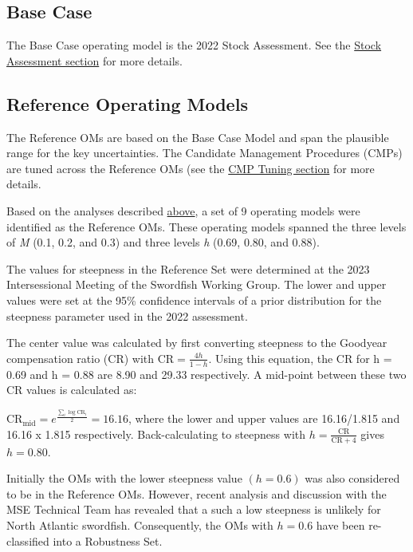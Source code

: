 \documentclass[
]{article}
\begin{document}
\hypertarget{base-case}{%
\subsection{Base Case}\label{base-case}}

The Base Case operating model is the 2022 Stock Assessment. See the \protect\hyperlink{stock-assessment}{Stock Assessment section} for more details.

\hypertarget{reference_models}{%
\subsection{Reference Operating Models}\label{reference_models}}

The Reference OMs are based on the Base Case Model and span the plausible range for the key uncertainties. The Candidate Management Procedures (CMPs) are tuned across the Reference OMs (see the \protect\hyperlink{tuning}{CMP Tuning section} for more details.

Based on the analyses described \protect\hyperlink{om-conditioning}{above}, a set of 9 operating models were identified as the Reference OMs. These operating models spanned the three levels of \emph{M} (0.1, 0.2, and 0.3) and three levels \emph{h} (0.69, 0.80, and 0.88).

The values for steepness in the Reference Set were determined at the 2023 Intersessional Meeting of the Swordfish Working Group. The lower and upper values were set at the 95\% confidence intervals of a prior distribution for the steepness parameter used in the 2022 assessment.

The center value was calculated by first converting steepness to the Goodyear compensation ratio (CR) with \(\text{CR}=\frac{4h}{1-h}\). Using this equation, the CR for h = 0.69 and h = 0.88 are 8.90 and 29.33 respectively. A mid-point between these two CR values is calculated as:

\(\text{CR}_\text{mid} = e^{\frac{\sum_i\log\text{CR}_i}{2}}=16.16\), where the lower and upper values are 16.16/1.815 and 16.16 x 1.815 respectively. Back-calculating to steepness with \(h=\frac{\text{CR}}{\text{CR}+4}\) gives \(h=0.80\).

Initially the OMs with the lower steepness value \((h=0.6)\) was also considered to be in the Reference OMs. However, recent analysis and discussion with the MSE Technical Team has revealed that a such a low steepness is unlikely for North Atlantic swordfish. Consequently, the OMs with \(h=0.6\) have been re-classified into a Robustness Set.
\end{document}

